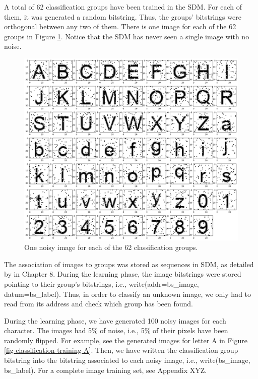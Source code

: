 
A total of 62 classification groups have been trained in the SDM. For each of them, it was generated a random bitstring. Thus, the groups' bitstrings were orthogonal between any two of them. There is one image for each of the 62 groups in Figure \ref{fig-classification-groups}. Notice that the SDM has never seen a single image with no noise.

\begin{figure}[!htb]
\centering\includegraphics[width=\textwidth]{./images02/classification/groups.png}
\caption{One noisy image for each of the 62 classification groups.
\label{fig-classification-groups}}
\end{figure}

The association of images to groups was stored as sequences in SDM, as detailed by \citet{Kanerva1988} in Chapter 8. During the learning phase, the image bitstrings were stored pointing to their group's bitstrings, i.e., write(addr=bs\_image, datum=bs\_label). Thus, in order to classify an unknown image, we only had to read from its address and check which group has been found.


During the learning phase, we have generated 100 noisy images for each character. The images had 5\% of noise, i.e., 5\% of their pixels have been randomly flipped. For example, see the generated images for letter A in Figure \ref{fig-classification-training-A}. Then, we have written the classification group bitstring into the bitstring associated to each noisy image, i.e., write(bs\_image, bs\_label). For a complete image training set, see Appendix XYZ.

